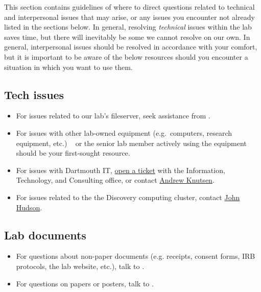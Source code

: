 \documentclass{tufte-book} %
\begin{document}

\noindent This section contains guidelines of where to direct questions related to technical and interpersonal issues that may arise, or any issues you encounter not already listed in the sections below. In general, resolving \textit{technical} issues within the lab saves time, but there will inevitably be some we cannot resolve on our own. In general, interpersonal issues should be resolved in accordance with your comfort, but it is important to be aware of the below resources should you encounter a situation in which you want to use them.

\subsection{Tech issues}
\begin{itemize}
\item For issues related to our lab's fileserver, seek assistance from \director.

\item For issues with other lab-owned equipment (e.g.~computers, research equipment, etc.) \coordinator~ or the senior lab member actively using the equipment should be your first-sought resource.

\item For issues with Dartmouth IT, \href{help@dartmouth.edu}{open a ticket} with the Information, Technology, and Consulting office, or contact \href{mailto:Andrew.C.Knutsen@Dartmouth.edu}{Andrew Knutsen}.

\item For issues related to the the Discovery computing cluster, contact \href{mailto:John.P.Hudson@Dartmouth.edu}{John Hudson}.
\end{itemize}

\subsection{Lab documents}
\begin{itemize}
\item For questions about non-paper documents (e.g. receipts, consent forms, IRB protocols, the lab website, etc.), talk to \coordinator.

\item For questions on papers or posters, talk to \director.
\end{itemize}
\end{document}
